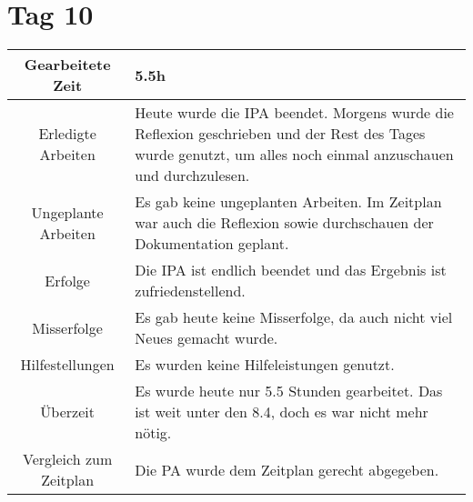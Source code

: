 \section{Tag 10}
\begin{tabularx}{\textwidth}[H]{|c|X|}
  \hline
  Gearbeitete Zeit & 5.5h \\ \hline
  Erledigte Arbeiten & Heute wurde die IPA beendet. Morgens wurde die Reflexion geschrieben und der Rest des Tages
  wurde genutzt, um alles noch einmal anzuschauen und durchzulesen. \\ \hline
  Ungeplante Arbeiten & Es gab keine ungeplanten Arbeiten. Im Zeitplan war auch die Reflexion sowie durchschauen
  der Dokumentation geplant. \\ \hline
  Erfolge & Die IPA ist endlich beendet und das Ergebnis ist zufriedenstellend. \\ \hline
  Misserfolge & Es gab heute keine Misserfolge, da auch nicht viel Neues gemacht wurde. \\ \hline
  Hilfestellungen & Es wurden keine Hilfeleistungen genutzt. \\ \hline
  Überzeit & Es wurde heute nur 5.5 Stunden gearbeitet. Das ist weit unter den 8.4, doch es war nicht mehr
  nötig. \\ \hline
  Vergleich zum Zeitplan & Die PA wurde dem Zeitplan gerecht abgegeben. \\ \hline
\end{tabularx}
